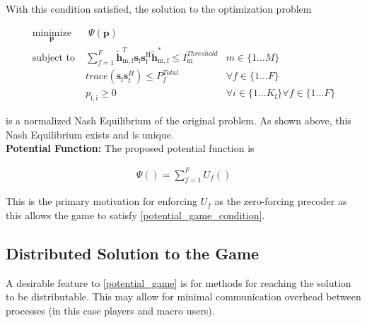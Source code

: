 \documentclass[12pt,a4paper]{report}
\begin{document}
With this condition satisfied, the solution to the optimization problem 

	
		\begin{subequations}
	\label{optim}
	\begin{align}
	    \underset{\mathbf{p}}{\text{minimize}}
	    & \; \Psi(\mathbf{p}) \label{potential_game} \\
	    \text{subject to} \; &
	  \sum^F_{f=1} \mathbf{\tilde{h}}_{\mathrm{m,f}}^T  \mathbf{s}_{\mathrm{f}} 						
	\mathbf{s_{\mathrm{f}}^{\mathrm{H}}} \mathbf{\tilde{h}_{\mathrm{m,f}}^*} \leq I^{Threshold}		
	_{\mathrm{m}} & m \in \{1 ...M\} 
		\label{interference_const}\\
        & trace(\mathbf{s}_\mathrm{f}\mathbf{s}_\mathrm{f}^H)  \leq P^{Total}_{f}  \label{power_const}
        & \forall f \in \{1 ... F\}\\
        & p_{\mathrm{f,i}} \geq 0 &  \forall i \in \{1 ...K_{\mathrm{f}}\} \forall f \in \{1 ... F\}\label{pos_power_const}
	\end{align}
	\end{subequations}

is a normalized Nash Equilibrium of the original problem.
As shown above, this Nash Equilibrium exists and is unique. 
\\
\textbf{Potential Function:} The proposed potential function is 

\begin{gather*} \label{Potential_Function}
\Psi() = \sum_{f = 1}^{F} U_f() 
\end{gather*}

This is the primary motivation for enforcing $U_f$ as the zero-forcing precoder as this allows the game to satisfy \eqref{potential_game_condition}. 


\subsection{Distributed Solution to the Game}
A desirable feature to \eqref{potential_game} is for methods for reaching the solution to be distributable. This may allow for minimal communication overhead between processes (in this case players and macro users).
\end{document}
